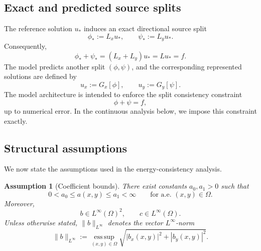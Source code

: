 \documentclass[11pt]{article}
\newtheorem{assumption}{Assumption}
\begin{document}
\subsection{Exact and predicted source splits}
\label{subsec:exact-predicted-splits}

The reference solution \(u_*\) induces an exact directional source split
\begin{equation}
    \phi_* := L_x u_*,
    \qquad
    \psi_* := L_y u_*.
    \label{eq:exact-split-definition}
\end{equation}
Consequently,
\begin{equation}
    \phi_*+\psi_*
    =
    (L_x+L_y)u_*
    =
    Lu_*
    =
    f.
    \label{eq:exact-split-consistency}
\end{equation}
The model predicts another split \((\phi,\psi)\), and the corresponding
represented solutions are defined by
\begin{equation}
    u_x := G_x[\phi],
    \qquad
    u_y := G_y[\psi].
    \label{eq:represented-solutions}
\end{equation}
The model architecture is intended to enforce the split consistency
constraint
\begin{equation}
    \phi+\psi=f,
    \label{eq:predicted-split-consistency}
\end{equation}
up to numerical error.  In the continuous analysis below, we impose this
constraint exactly.

\subsection{Structural assumptions}
\label{subsec:structural-assumptions}

We now state the assumptions used in the energy-consistency analysis.

\begin{assumption}[Coefficient bounds]
\label{assumption:coefficient-bounds}
There exist constants \(a_0,a_1>0\) such that
\begin{equation}
    0<a_0\le a(x,y)\le a_1<\infty
    \qquad
    \text{for a.e. }(x,y)\in\Omega.
    \label{eq:a-bounds}
\end{equation}
Moreover,
\[
    b\in L^\infty(\Omega)^2,
    \qquad
    c\in L^\infty(\Omega).
\]
Unless otherwise stated, \(\|b\|_{L^\infty}\) denotes the vector
\(L^\infty\)-norm
\[
    \|b\|_{L^\infty}
    :=
    \operatorname*{ess\,sup}_{(x,y)\in\Omega}
    \sqrt{|b_x(x,y)|^2+|b_y(x,y)|^2}.
\]
\end{assumption}
\end{document}
